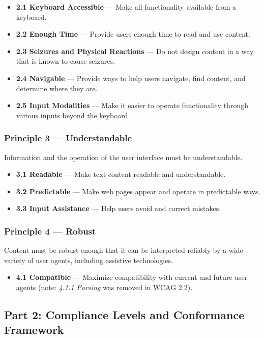 \documentclass[11pt,a4paper]{article}
\begin{document}
		\begin{itemize}
 		 \item \textbf{2.1 Keyboard Accessible} --- Make all functionality available
      		  from a keyboard.
		  \item \textbf{2.2 Enough Time} --- Provide users enough time to read and use
       		 content.
 		 \item \textbf{2.3 Seizures and Physical Reactions} --- Do not design content
    		    in a way that is known to cause seizures.
		  \item \textbf{2.4 Navigable} --- Provide ways to help users navigate, find
    		    content, and determine where they are.
		  \item \textbf{2.5 Input Modalities} --- Make it easier to operate
       		 functionality through various inputs beyond the keyboard.
		\end{itemize}

		
		\subsubsection{Principle 3 --- Understandable}
		Information and the operation of the user interface must be understandable.
		\begin{itemize}
		  \item \textbf{3.1 Readable} --- Make text content readable and
       		 understandable.
		  \item \textbf{3.2 Predictable} --- Make web pages appear and operate in
       		 predictable ways.
		  \item \textbf{3.3 Input Assistance} --- Help users avoid and correct
      		  mistakes.
		\end{itemize}


		\subsubsection{Principle 4 --- Robust}
		Content must be robust enough that it can be interpreted reliably by a wide
		variety of user agents, including assistive technologies.
		
		\begin{itemize}
 		 \item \textbf{4.1 Compatible} --- Maximize compatibility with current and
     		   future user agents (note: \emph{4.1.1 Parsing} was removed in WCAG
     		   2.2).
		\end{itemize}


	\subsection{Part 2: Compliance Levels and Conformance Framework}
\end{document}
